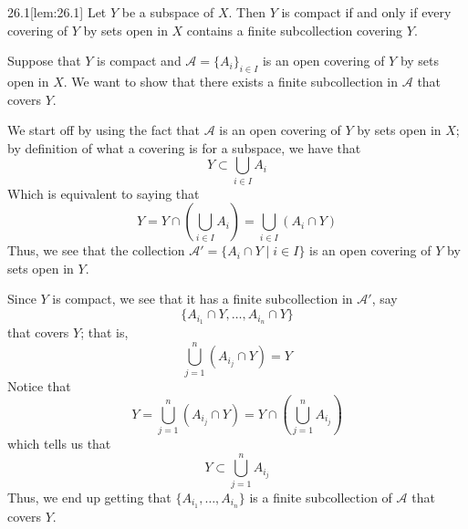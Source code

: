 \begin{thmBox}[Lemma]{26.1}[lem:26.1]
    Let \( Y \) be a subspace of \( X \).
    Then \( Y \) is compact if and only if every covering of \( Y \) by sets
    open in \( X \) contains a finite subcollection covering \( Y \).

    \baseRule

    \begin{proofBox}
        Suppose that \( Y \) is compact and \( \mathcal{A} = 
        \{ A_{ i } \}_{ i \in I } \) is an open covering of \( Y \) by sets 
        open in \( X \).
        We want to show that there exists a finite subcollection in 
        \( \mathcal{A} \) that covers \( Y \).

        \baseSkip

       We start off by using the fact that \( \mathcal{A} \) is an open covering
       of \( Y \) by sets open in \( X \); by definition of what a covering 
       is for a subspace, we have that 
        \begin{equation*}
            Y \subset \bigcup_{ i \in I } A_{ i }
        \end{equation*}
        Which is equivalent to saying that 
        \begin{equation*}
            Y
            =
            Y \cap \left( \bigcup_{ i \in I } A_{ i } \right)
            =
            \bigcup_{ i \in I } ( A_{ i } \cap Y )
        \end{equation*}
        Thus, we see that the collection \( \mathcal{A}' = 
        \{ A_{ i } \cap Y \mid i \in I \} \) is an open covering of \( Y \) 
        by sets open in \( Y \).

        \baseSkip

        Since \( Y \) is compact, we see that it has a finite subcollection
        in \( \mathcal{A}' \), say 
        \begin{equation*}
            \{ A_{ i_{ 1 } } \cap Y , \ldots , A_{ i_{ n } } \cap Y \}
        \end{equation*}
        that covers \( Y \); that is, 
        \begin{equation*}
            \bigcup_{ j = 1 }^{ n } ( A_{ i_{ j } } \cap Y )
            =
            Y
        \end{equation*}
        Notice that 
        \begin{equation*}
            Y
            =
            \bigcup_{ j = 1 }^{ n } ( A_{ i_{ j } } \cap Y )
            =
            Y \cap \left( \bigcup_{ j = 1 }^{ n } A_{ i_{ j } } \right)
        \end{equation*}
        which tells us that 
        \begin{equation*}
            Y \subset \bigcup_{ j = 1 }^{ n } A_{ i_{ j } }
        \end{equation*}
        Thus, we end up getting that \( \{ A_{ i_{ 1 } } , \ldots , 
        A_{ i_{ n } } \} \) is a finite subcollection of \( \mathcal{A} \) that 
        covers \( Y \).


\end{proofBox}
\end{thmBox}
